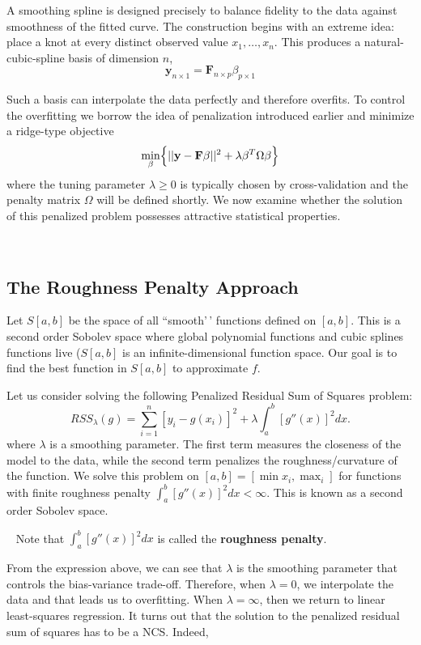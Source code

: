 \documentclass[
]{book}
\begin{document}
A smoothing spline is designed precisely to balance fidelity to the data against smoothness of the fitted curve. The construction begins with an extreme idea: place a knot at every distinct observed value \(x_1,\dots,x_n\). This produces a natural-cubic-spline basis of dimension \(n\),
\[\mathbf{y}_{n\times 1} = \mathbf{F}_{n\times p} \beta_{p\times 1}\]

Such a basis can interpolate the data perfectly and therefore overfits. To control the overfitting we borrow the idea of penalization introduced earlier and minimize a ridge-type objective
\[\min_{\beta} \Bigl\{ ||\mathbf{y}-\mathbf{F} \beta ||^2 + \lambda \beta^T \Omega \beta \Bigr\}\]
where the tuning parameter \(\lambda\ge 0\) is typically chosen by cross-validation and the penalty matrix \(\Omega\) will be defined shortly.
We now examine whether the solution of this penalized problem possesses attractive statistical properties.

~

\subsection{The Roughness Penalty Approach}\label{the-roughness-penalty-approach}

Let \(S[a,b]\) be the space of all ``smooth'\,' functions defined on \([a,b]\). This is a second order Sobolev space where global polynomial functions and cubic splines functions live (\(S[a,b]\) is an infinite-dimensional function space. Our goal is to find the best function in \(S[a,b]\) to approximate \(f\).

Let us consider solving the following Penalized Residual Sum of Squares problem:
\[
RSS_\lambda(g) = \sum_{i=1}^n [y_i - g(x_i)]^2  + \lambda \int_a^b [g''(x)]^2 dx.
\]
where \(\lambda\) is a smoothing parameter. The first term measures the closeness of the model to the data, while the second term penalizes the roughness/curvature of the function. We solve this problem on \([a,b]=[\min x_i, \max _i]\) for functions with finite roughness penalty \(\int_a^b [g''(x)]^2 dx < \infty\). This is known as a second order Sobolev space.

~
Note that \(\int_a^b [g''(x)]^2 dx\) is called the \textbf{roughness penalty}.
~

From the expression above, we can see that \(\lambda\) is the smoothing parameter that controls the bias-variance trade-off. Therefore, when \(\lambda=0\), we interpolate the data and that leads us to overfitting. When \(\lambda=\infty\), then we return to linear least-squares regression. It turns out that the solution to the penalized residual sum of squares has to be a NCS. Indeed,
\end{document}
